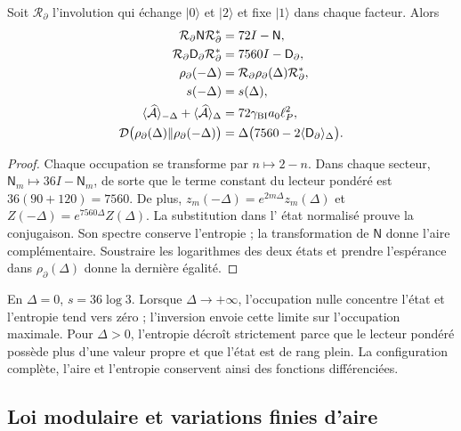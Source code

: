 \begin{theorem}
\label{vii:thm:inversion-sectorial}
Soit \(\mathcal R_\partial\) l'involution qui échange
\(|0\rangle\) et \(|2\rangle\) et fixe \(|1\rangle\) dans chaque
facteur. Alors
\begin{align}
 \mathcal R_\partial\mathsf N\mathcal R_\partial^*&=72I-\mathsf N,\\
 \mathcal R_\partial\mathsf D_\partial\mathcal R_\partial^*
 &=7560I-\mathsf D_\partial,\\
 \rho_\partial(-\Delta)&=\mathcal R_\partial\rho_\partial(\Delta)
                          \mathcal R_\partial^*,\\
 s(-\Delta)&=s(\Delta),\\
 \langle\widehat{\mathcal A}\rangle_{-\Delta}
 +\langle\widehat{\mathcal A}\rangle_\Delta
 &=72\gamma_{\rm BI}a_0\ell_P^2,\\
 \mathcal D\bigl(\rho_\partial(\Delta)\Vert\rho_\partial(-\Delta)\bigr)
 &=\Delta\bigl(7560-2\langle\mathsf D_\partial\rangle_\Delta\bigr).
 \label{vii:eq:inversion-sectorial}
\end{align}
\end{theorem}
\begin{proof}
Chaque occupation se transforme par \(n\mapsto2-n\). Dans chaque secteur,
\(\mathsf N_m\mapsto36I-\mathsf N_m\), de sorte que le terme
constant du lecteur pondéré est \(36(90+120)=7560\).
De plus, \(z_m(-\Delta)=e^{2m\Delta}z_m(\Delta)\) et
\(Z(-\Delta)=e^{7560\Delta}Z(\Delta)\). La substitution dans l'
état normalisé prouve la conjugaison. Son spectre conserve l'entropie ;
la transformation de \(\mathsf N\) donne l'aire complémentaire. Soustraire
les logarithmes des deux états et prendre l'espérance dans
\(\rho_\partial(\Delta)\) donne la dernière égalité.
\end{proof}

En \(\Delta=0\), \(s=36\log3\). Lorsque \(\Delta\to+\infty\),
l'occupation nulle concentre l'état et l'entropie tend vers zéro ;
l'inversion envoie cette limite sur l'occupation maximale. Pour \(\Delta>0\),
l'entropie décroît strictement parce que le lecteur pondéré possède plus
d'une valeur propre et que l'état est de rang plein. La configuration
complète, l'aire et l'entropie conservent ainsi des fonctions différenciées.

\subsection{Loi modulaire et variations finies d'aire}
\label{vii:subsec:ley-modular-finita}

